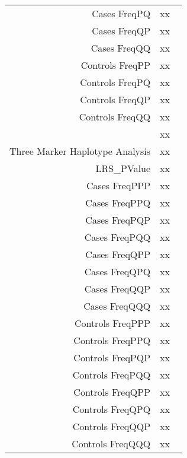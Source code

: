\begin{supertabular}{r p{5in}}
    Cases FreqPQ  & xx  \\
    Cases FreqQP  & xx  \\
    Cases FreqQQ  & xx  \\
    Controls FreqPP  & xx  \\
    Controls FreqPQ  & xx  \\
    Controls FreqQP  & xx  \\
    Controls FreqQQ  & xx  \\
  ~ & xx ~ \\
  Three Marker Haplotype Analysis & xx ~ \\
    LRS\_PValue  & xx  \\
    Cases FreqPPP  & xx  \\
    Cases FreqPPQ  & xx  \\
    Cases FreqPQP  & xx  \\
    Cases FreqPQQ  & xx  \\
    Cases FreqQPP  & xx  \\
    Cases FreqQPQ  & xx  \\
    Cases FreqQQP  & xx  \\
    Cases FreqQQQ  & xx  \\
    Controls FreqPPP  & xx  \\
    Controls FreqPPQ  & xx  \\
    Controls FreqPQP  & xx  \\
    Controls FreqPQQ  & xx  \\
    Controls FreqQPP  & xx  \\
    Controls FreqQPQ  & xx  \\
    Controls FreqQQP  & xx  \\
    Controls FreqQQQ  & xx  \\
\end{supertabular} 

